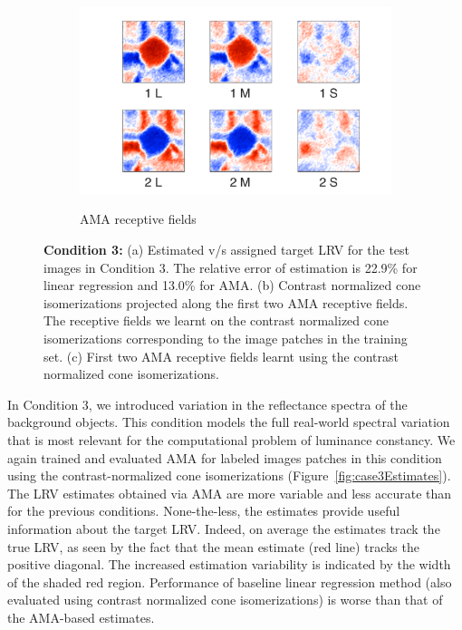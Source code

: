 \documentclass{jov}
\begin{document}
\begin{figure}
\begin{subfigure}[b]{0.26\textwidth}
        \label{fig:case3RFResponse}
    \end{subfigure}
    ~
    \begin{subfigure}[b]{0.28 \textwidth}
	\caption{AMA receptive fields}
	\includegraphics[width=1.07\textwidth, trim={0 -0.6cm 0 -0.5cm}]{../FiguresDraft4/Figure12/Figure12_c.pdf}
	\label{fig:case3RFs}
    \end{subfigure}
    \caption{{\bf Condition 3:} (a) Estimated v/s assigned target LRV for the test images in Condition 3. The relative error of estimation is 22.9\%  for linear regression and 13.0\% for AMA. (b) Contrast normalized cone isomerizations projected along the first two AMA receptive fields. The receptive fields we learnt on the contrast normalized cone isomerizations corresponding to the image patches in the training set. (c) First two AMA receptive fields learnt using the contrast normalized cone isomerizations.}
\label{fig:Condition3}
\end{figure}

In Condition 3, we introduced variation in the reflectance spectra of the background objects.
This condition models the full real-world spectral variation that is most relevant for the computational problem of luminance constancy.
We again trained and evaluated AMA for labeled images patches in this condition using the contrast-normalized cone isomerizations 
(Figure~\ref{fig:case3Estimates}).
The LRV estimates obtained via AMA are more variable and less accurate than for the previous conditions.
None-the-less, the estimates provide useful information about the target LRV.
Indeed, on average the estimates track the true LRV, as seen by the fact that the mean estimate
(red line) tracks the positive diagonal.
The increased estimation variability is indicated by the width of the shaded red region.
Performance of baseline linear regression method (also evaluated using contrast normalized cone isomerizations) is worse than that of the AMA-based estimates.
\end{document}
